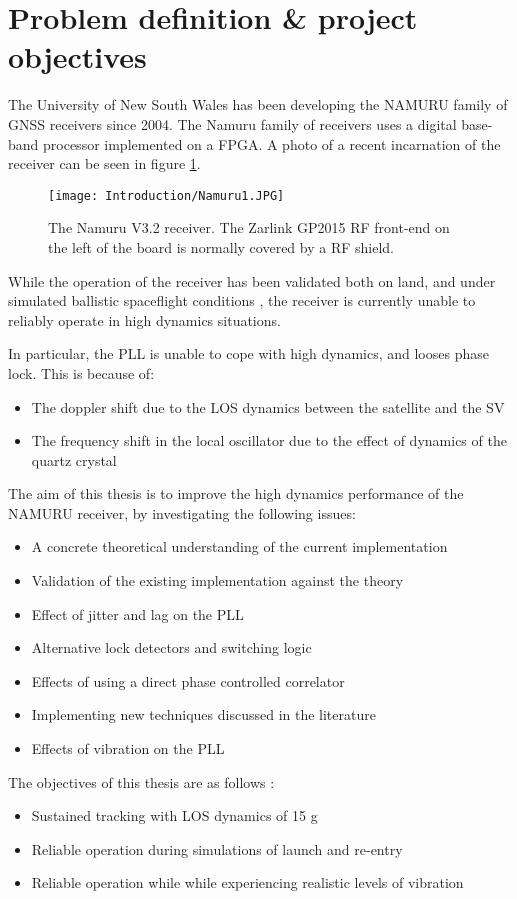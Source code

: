 \section{Problem definition \& project objectives}

The University of New South Wales has been developing the \ac{NAMURU} family of \ac{GNSS} receivers since 2004\cite{MumfordNamuru}. The Namuru family of receivers uses a digital base-band processor implemented on a \ac{FPGA}\cite{Glennon11aquariusfirmware}. A photo of a recent incarnation of the receiver can be seen in figure \ref{fig:Namuru1}.

\begin{figure}[!htb] 
    \centering
    \texttt{[image: Introduction/Namuru1.JPG]} 
    \caption{The Namuru V3.2 receiver. The Zarlink GP2015 \ac{RF} front-end on the left of the board is normally covered by a \ac{RF} shield.}
    \label{fig:Namuru1}
\end{figure}

While the operation of the receiver has been validated both on land, and under simulated ballistic spaceflight conditions \cite{NamuruSpaceflight1,NamuruSpaceflight2}, the receiver is currently unable to reliably operate in high dynamics situations. 

In particular, the \ac{PLL} is unable to cope with high dynamics, and looses phase lock. This is because of: 
\begin{itemize}
\item{The doppler shift due to the \ac{LOS} dynamics between the satellite and the \ac{SV}}
\item{The frequency shift in the local oscillator due to the effect of dynamics of the quartz crystal}
\end{itemize}

The aim of this thesis is to improve the high dynamics performance of the \ac{NAMURU} receiver, by investigating the following issues:  

\begin{itemize}
\item{A concrete theoretical understanding of the current implementation}
\item{Validation of the existing implementation against the theory}
\item{Effect of jitter and lag on the \ac{PLL}}
\item{Alternative lock detectors and switching logic}
\item{Effects of using a direct phase controlled correlator}
\item{Implementing new techniques discussed in the literature}
\item{Effects of vibration on the \ac{PLL}}
\end{itemize}

The objectives of this thesis are as follows : 
\begin{itemize}
\item{Sustained tracking with \ac{LOS} dynamics of 15 g}
\item{Reliable operation during simulations of launch and re-entry}
\item{Reliable operation while while experiencing realistic levels of vibration}
\end{itemize}
